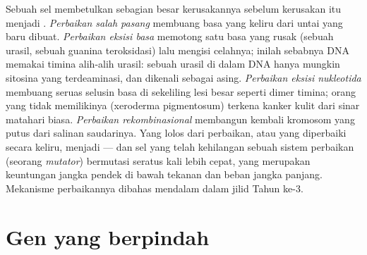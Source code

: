 \begin{proposition}\label{prop:b2:genome-diversification:repair}
Sebuah sel membetulkan sebagian besar kerusakannya sebelum kerusakan
itu menjadi . \emph{Perbaikan salah pasang} membuang basa yang
keliru dari untai yang baru dibuat. \emph{Perbaikan eksisi basa}
memotong satu basa yang rusak (sebuah urasil, sebuah guanina
teroksidasi) lalu mengisi celahnya; inilah sebabnya DNA memakai timina
alih-alih urasil: sebuah urasil di dalam DNA hanya mungkin sitosina
yang terdeaminasi, dan dikenali sebagai asing. \emph{Perbaikan eksisi
nukleotida} membuang seruas selusin basa di sekeliling lesi besar
seperti dimer timina; orang yang tidak memilikinya (xeroderma
pigmentosum) terkena kanker kulit dari sinar matahari biasa.
\emph{Perbaikan rekombinasional} membangun kembali kromosom yang putus
dari salinan saudarinya. Yang lolos dari perbaikan, atau yang
diperbaiki secara keliru, menjadi  --- dan sel yang telah
kehilangan sebuah sistem perbaikan (seorang \emph{mutator}) bermutasi
seratus kali lebih cepat, yang merupakan keuntungan jangka pendek di
bawah tekanan dan beban jangka panjang. Mekanisme perbaikannya dibahas
mendalam dalam jilid Tahun ke-3.
\end{proposition}

\section{Gen yang berpindah}

